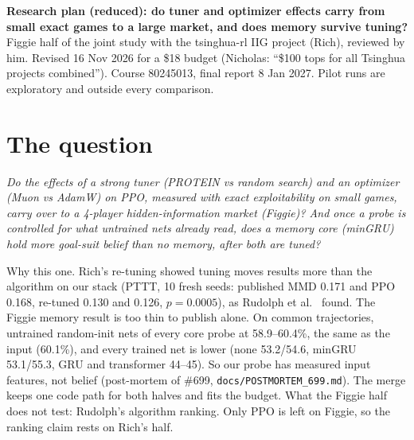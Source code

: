 \documentclass[10pt]{article}
\newcommand{\file}[1]{{\small\texttt{#1}}}
\begin{document}
{\large\bfseries Research plan (reduced): do tuner and optimizer effects carry from small exact games to a large market, and does memory survive tuning?}\\[1pt]
{\small Figgie half of the joint study with the tsinghua-rl IIG project (Rich), reviewed by him. Revised 16 Nov 2026 for a \$18 budget (Nicholas: ``\$100 tops for all Tsinghua projects combined''). Course 80245013, final report 8 Jan 2027. Pilot runs are exploratory and outside every comparison.}

\section{The question}
\emph{Do the effects of a strong tuner (PROTEIN vs random search) and an optimizer (Muon vs AdamW) on PPO, measured with exact exploitability on small games, carry over to a 4-player hidden-information market (Figgie)? And once a probe is controlled for what untrained nets already read, does a memory core (minGRU) hold more goal-suit belief than no memory, after both are tuned?}

Why this one. Rich's re-tuning showed tuning moves results more than the algorithm on our stack (PTTT, 10 fresh seeds: published MMD 0.171 and PPO 0.168, re-tuned 0.130 and 0.126, $p=0.0005$), as Rudolph et al.~\cite{rudolph} found. The Figgie memory result is too thin to publish alone. On common trajectories, untrained random-init nets of every core probe at 58.9--60.4\%, the same as the input (60.1\%), and every trained net is lower (none 53.2/54.6, minGRU 53.1/55.3, GRU and transformer 44--45). So our probe has measured input features, not belief (post-mortem of \#699, \file{docs/POSTMORTEM\_699.md}). The merge keeps one code path for both halves and fits the budget.
What the Figgie half does not test: Rudolph's algorithm ranking. Only PPO is left on Figgie, so the ranking claim rests on Rich's half.
\end{document}
